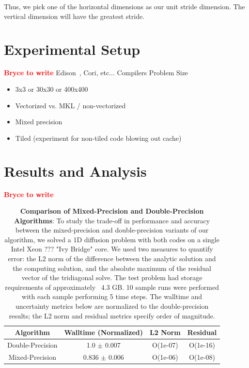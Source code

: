 \documentclass[conference]{IEEEtran}
\newcommand{\fix}[1]{{\bf \textcolor {red}{#1}}}
\begin{document}
Thus, we pick one of the horizontal dimensions as our unit stride dimension.
The vertical dimension will have the greatest stride. 

\section{Experimental Setup}
\fix{Bryce to write}
Edison~\cite{Edison_website}, Cori, etc...
Compilers
Problem Size

\begin{itemize}
\item 3x3 or 30x30 or 400x400
\item Vectorized vs. MKL / non-vectorized
\item Mixed precision
\item Tiled (experiment for non-tiled code blowing out cache)
\end{itemize}

\section{Results and Analysis}
\fix{Bryce to write}

\begin{table}%
\center
\scriptsize
\caption{\textbf{Comparison of Mixed-Precision and Double-Precision Algorithms}:
To study the trade-off in performance and accuracy between the mixed-precision
and double-precision variants of our algorithm, we solved a 1D diffusion
problem with both codes on a single Intel Xeon ??? "Ivy Bridge" core. We used
two measures to quantify error: the L2 norm of the difference between the
analytic solution and the computing solution, and the absolute maximum of the
residual vector of the tridiagonal solve. The test problem had storage
requirements of approximately ~4.3 GB. 10 sample runs were performed with each
sample performing 5 time steps. The walltime and uncertainty metrics below are
normalized to the double-precision results; the L2 norm and residual metrics
specify order of magnitude.
}
\small
\setlength{\tabcolsep}{3pt}
\begin{tabular}{|c|c|c|c|} \hline
\textbf{Algorithm} & \textbf{Walltime (Normalized)} & \textbf{L2 Norm} & \textbf{Residual} \\ \hline
Double-Precision   & 1.0   $\pm$ 0.007              & O(1e-07)         & O(1e-16)          \\ \hline 
Mixed-Precision    & 0.836 $\pm$ 0.006              & O(1e-06)         & O(1e-08)          \\ \hline
\end{tabular}
\label{tab:mixed_vs_double}
\end{table}
\end{document}
